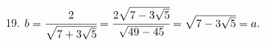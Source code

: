 19. $b=\cfrac{2}{\sqrt{7+3\sqrt{5}}}=\cfrac{2\sqrt{7-3\sqrt{5}}}{\sqrt{49-45}}=\sqrt{7-3\sqrt{5}}=a.$\\
